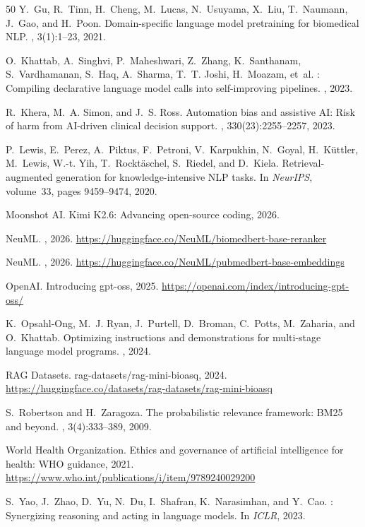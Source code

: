 \documentclass[sigconf,anonymous,review]{acmart}
\begin{document}
\begin{thebibliography}{50}
Y.~Gu, R.~Tinn, H.~Cheng, M.~Lucas, N.~Usuyama, X.~Liu, T.~Naumann, J.~Gao, and H.~Poon.
\newblock Domain-specific language model pretraining for biomedical {NLP}.
, 3(1):1--23, 2021.

O.~Khattab, A.~Singhvi, P.~Maheshwari, Z.~Zhang, K.~Santhanam, S.~Vardhamanan, S.~Haq, A.~Sharma, T.~T. Joshi, H.~Moazam, et~al.
: {C}ompiling declarative language model calls into self-improving pipelines.
, 2023.

R.~Khera, M.~A. Simon, and J.~S. Ross.
\newblock Automation bias and assistive {AI}: {R}isk of harm from {AI}-driven clinical decision support.
, 330(23):2255--2257, 2023.

P.~Lewis, E.~Perez, A.~Piktus, F.~Petroni, V.~Karpukhin, N.~Goyal, H.~K\"uttler, M.~Lewis, W.-t. Yih, T.~Rockt\"aschel, S.~Riedel, and D.~Kiela.
\newblock Retrieval-augmented generation for knowledge-intensive {NLP} tasks.
\newblock In {\em NeurIPS}, volume~33, pages 9459--9474, 2020.

Moonshot AI.
\newblock Kimi {K2.6}: {A}dvancing open-source coding, 2026.

NeuML.
, 2026.
\newblock \url{https://huggingface.co/NeuML/biomedbert-base-reranker}

NeuML.
, 2026.
\newblock \url{https://huggingface.co/NeuML/pubmedbert-base-embeddings}

OpenAI.
\newblock Introducing gpt-oss, 2025.
\newblock \url{https://openai.com/index/introducing-gpt-oss/}

K.~Opsahl-Ong, M.~J. Ryan, J.~Purtell, D.~Broman, C.~Potts, M.~Zaharia, and O.~Khattab.
\newblock Optimizing instructions and demonstrations for multi-stage language model programs.
, 2024.

RAG Datasets.
\newblock rag-datasets/rag-mini-bioasq, 2024.
\newblock \url{https://huggingface.co/datasets/rag-datasets/rag-mini-bioasq}

S.~Robertson and H.~Zaragoza.
\newblock The probabilistic relevance framework: {BM25} and beyond.
, 3(4):333--389, 2009.

World Health Organization.
\newblock Ethics and governance of artificial intelligence for health: {WHO} guidance, 2021.
\newblock \url{https://www.who.int/publications/i/item/9789240029200}

S.~Yao, J.~Zhao, D.~Yu, N.~Du, I.~Shafran, K.~Narasimhan, and Y.~Cao.
: {S}ynergizing reasoning and acting in language models.
\newblock In {\em ICLR}, 2023.

\end{thebibliography}
\end{document}
